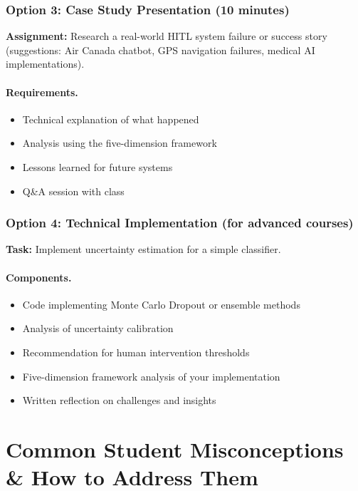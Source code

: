 \subsubsection{Option 3: Case Study Presentation (10 minutes)}

\textbf{Assignment:} Research a real-world HITL system failure or success story (suggestions: Air Canada chatbot, GPS navigation failures, medical AI implementations).

\paragraph{Requirements.}
\begin{itemize}
    \item Technical explanation of what happened
    \item Analysis using the five-dimension framework
    \item Lessons learned for future systems
    \item Q\&A session with class
\end{itemize}

\subsubsection{Option 4: Technical Implementation (for advanced courses)}

\textbf{Task:} Implement uncertainty estimation for a simple classifier.

\paragraph{Components.}
\begin{itemize}
    \item Code implementing Monte Carlo Dropout or ensemble methods
    \item Analysis of uncertainty calibration
    \item Recommendation for human intervention thresholds
    \item Five-dimension framework analysis of your implementation
    \item Written reflection on challenges and insights
\end{itemize}

\section{Common Student Misconceptions \& How to Address Them}

